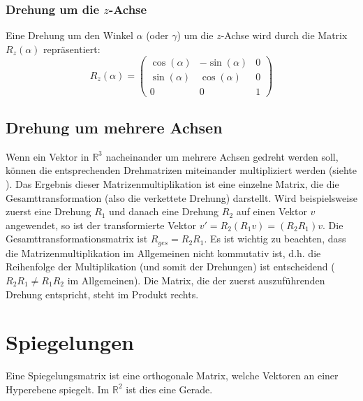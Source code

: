 \subsubsection*{Drehung um die $z$-Achse}
Eine Drehung um den Winkel $\alpha$ (oder $\gamma$) um die $z$-Achse wird durch die Matrix $R_z(\alpha)$ repräsentiert:
\[
   R_z(\alpha) = \begin{pmatrix}
       \cos(\alpha) & -\sin(\alpha) & 0 \\
       \sin(\alpha) & \cos(\alpha) & 0 \\
       0 & 0 & 1
   \end{pmatrix}
\]

\subsection{Drehung um mehrere Achsen}
Wenn ein Vektor in $\mathbb{R}^3$ nacheinander um mehrere Achsen gedreht werden soll, können die entsprechenden Drehmatrizen miteinander multipliziert werden (siehte ). Das Ergebnis dieser Matrizenmultiplikation ist eine einzelne Matrix, die die Gesamttransformation (also die verkettete Drehung) darstellt.
Wird beispielsweise zuerst eine Drehung $R_1$ und danach eine Drehung $R_2$ auf einen Vektor $v$ angewendet, so ist der transformierte Vektor $v' = R_2 (R_1 v) = (R_2 R_1) v$. Die Gesamttransformationsmatrix ist $R_{ges} = R_2 R_1$.
Es ist wichtig zu beachten, dass die Matrizenmultiplikation im Allgemeinen nicht kommutativ ist, d.h. die Reihenfolge der Multiplikation (und somit der Drehungen) ist entscheidend ($R_2 R_1 \neq R_1 R_2$ im Allgemeinen). Die Matrix, die der zuerst auszuführenden Drehung entspricht, steht im Produkt rechts.

\section{Spiegelungen}

Eine Spiegelungsmatrix ist eine orthogonale Matrix, welche Vektoren an einer Hyperebene spiegelt. Im $\mathbb{R}^2$ ist dies eine Gerade.

